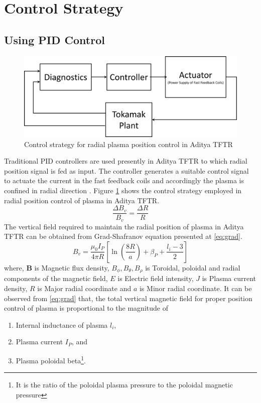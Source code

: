 \section{Control Strategy}
\subsection{Using PID Control}
\begin{figure}[b!] 
	\centering
	\includegraphics[width=0.95\linewidth]{Chapter5/chapter5/Fig2_ControlStrategy}
	\caption[Control Strategy for Aditya TFTR]{Control strategy for radial plasma position control in Aditya TFTR}
	\label{fig:Fig5_2}
\end{figure} 
Traditional PID controllers are used presently in Aditya TFTR to which radial position signal is fed as input. The controller generates a suitable control signal to actuate the current in the fast feedback coils and accordingly the plasma is confined in radial direction \cite{Suratia2012}. Figure \ref{fig:Fig5_2} shows the control strategy employed in radial position control of plasma in Aditya TFTR. 
\[\frac{{\Delta {B_v}}}{{{B_v}}} = \frac{{\Delta R}}{R}\]
The vertical field required to maintain the radial position of plasma in Aditya TFTR can be obtained from Grad-Shafranov equation \cite{Mukhovatov1971,Suratia2012} presented at \eqref{eq:grad}. 
\begin{equation} \label{eq:grad}
{B_v} = \frac{{{\mu _0}{I_P}}}{{4\pi R}}\left[ {\ln \left( {\frac{{8R}}{a}} \right) + {\beta _P} + \frac{{{l_i} - 3}}{2}} \right]
\end{equation}
where, 	\textbf{B} is Magnetic flux density,
$ B_\phi, B_\theta, B_\rho $ is Toroidal, poloidal and radial components of the magnetic field, $E$ is Electric field intensity, $ J $ is Plasma current density, $ R $ is Major radial coordinate and $ a $ is Minor radial coordinate.
It can be observed from \eqref{eq:grad} that, the total vertical magnetic field for proper position control of plasma is proportional to the magnitude of 
\begin{enumerate}
	\item Internal inductance of plasma $ {l_i} $,
	\item Plasma current $ I_P $, and
	\item Plasma poloidal beta\footnote{ It is the ratio of the poloidal plasma pressure to the poloidal magnetic pressure}.
\end{enumerate} 
